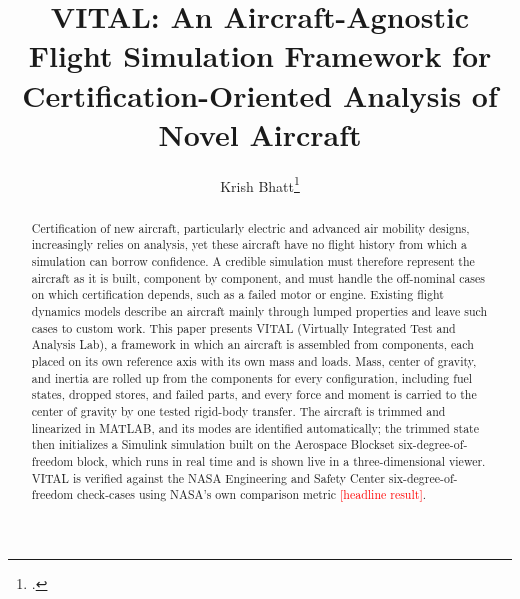 \documentclass[conf]{new-aiaa}
\title{VITAL: An Aircraft-Agnostic Flight Simulation Framework for Certification-Oriented Analysis of Novel Aircraft}
\author{Krish Bhatt\footnote{\tbd{Job title, Department, Address, AIAA Member Grade}.}
  \tbd{and co-authors}}
\affil{Virginia Tech, Blacksburg, Virginia, 24061}
\newcommand{\tbd}[1]{\textcolor{red}{[#1]}}
\begin{document}
\maketitle

\begin{abstract}
Certification of new aircraft, particularly electric and advanced air mobility designs,
increasingly relies on analysis, yet these aircraft have no flight history from which a
simulation can borrow confidence. A credible simulation must therefore represent the
aircraft as it is built, component by component, and must handle the off-nominal cases on
which certification depends, such as a failed motor or engine. Existing flight dynamics
models describe an aircraft mainly through lumped properties and leave such cases to
custom work. This paper presents VITAL (Virtually Integrated Test and Analysis Lab), a
framework in which an aircraft is assembled from components, each placed on its own
reference axis with its own mass and loads. Mass, center of gravity, and inertia are rolled
up from the components for every configuration, including fuel states, dropped stores, and
failed parts, and every force and moment is carried to the center of gravity by one tested
rigid-body transfer. The aircraft is trimmed and linearized in MATLAB, and its modes are
identified automatically; the trimmed state then initializes a Simulink simulation built on
the Aerospace Blockset six-degree-of-freedom block, which runs in real time and is shown live
in a three-dimensional viewer. VITAL is verified against the NASA Engineering and Safety
Center six-degree-of-freedom check-cases using NASA's own comparison metric
\tbd{headline result}.
\end{abstract}

\end{document}
